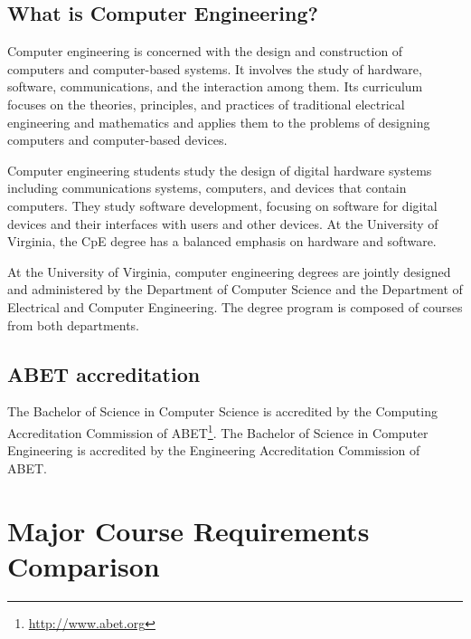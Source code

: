 \documentclass[10pt,letter,twocolumn]{book}
\newcommand{\mysection}[1]{\section{#1}\renewcommand{\rightmark}{#1}}
\newcommand{\myurlremember}[2]{\footnote{\scriptsize\url{#2}}\newcounter{#1}\setcounter{#1}{\value{footnote}}}
\newcommand{\myurlrecall}[1]{\footnotemark[\value{#1}]}
\begin{document}
\subsection{What is Computer Engineering?}

Computer engineering is concerned with the design and construction of
computers and computer-based systems. It involves the study of
hardware, software, communications, and the interaction among
them. Its curriculum focuses on the theories, principles, and
practices of traditional electrical engineering and mathematics and
applies them to the problems of designing computers and computer-based
devices.

Computer engineering students study the design of digital hardware
systems including communications systems, computers, and devices that
contain computers. They study software development, focusing on
software for digital devices and their interfaces with users and other
devices. At the University of Virginia, the CpE degree has a balanced
emphasis on hardware and software.

At the University of Virginia, computer engineering degrees are
jointly designed and administered by the Department of Computer
Science and the Department of Electrical and Computer Engineering. The
degree program is composed of courses from both departments. 

\subsection{ABET accreditation}

The Bachelor of Science in Computer Science is accredited by the
Computing Accreditation Commission of
ABET\myurlremember{abet}{http://www.abet.org}.  The Bachelor of
Science in Computer Engineering is accredited by the Engineering
Accreditation Commission of ABET\myurlrecall{abet}.



\mysection{Major Course Requirements Comparison}

\begin{figure}[h!]
\label{fig:coursereqscomparison}
\begin{center}
\end{center}
\end{figure}
\end{document}
